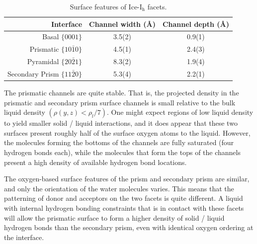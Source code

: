 \begin{table}[h]
\centering
\caption{Surface features of Ice-I$_\mathrm{h}$ facets.\label{tab:surf}}
\begin{tabular}{r|cc}  
\toprule
Interface & Channel width (\AA) & Channel depth (\AA) \\ 
\midrule
Basal  $\{0001\}$                 & 3.5(2) & 0.9(1)  \\
Prismatic  $\{10\bar{1}0\}$       & 4.5(1) & 2.4(3)  \\
Pyramidal  $\{20\bar{2}1\}$       & 8.3(2) & 1.9(4)  \\
Secondary Prism  $\{11\bar{2}0\}$ & 5.3(4) & 2.2(1)  \\ 
\bottomrule
\end{tabular}
\end{table}

The prismatic channels are quite stable. That is, the projected
density in the prismatic and secondary prism surface channels is small
relative to the bulk liquid density $(\rho(y,z) < \rho_l / 7)$.  One
might expect regions of low liquid density to yield smaller solid /
liquid interactions, and it does appear that these two surfaces
present roughly half of the surface oxygen atoms to the liquid.
However, the molecules forming the bottoms of the channels are fully
saturated (four hydrogen bonds each), while the molecules that form
the tops of the channels present a high density of available hydrogen
bond locations.

The oxygen-based surface features of the prism and secondary prism are
similar, and only the orientation of the water molecules varies.  This
means that the patterning of donor and acceptors on the two facets is
quite different. A liquid with internal hydrogen bonding constraints
that is in contact with these facets will allow the prismatic surface
to form a higher density of solid / liquid hydrogen bonds than the
secondary prism, even with identical oxygen ordering at the interface.


